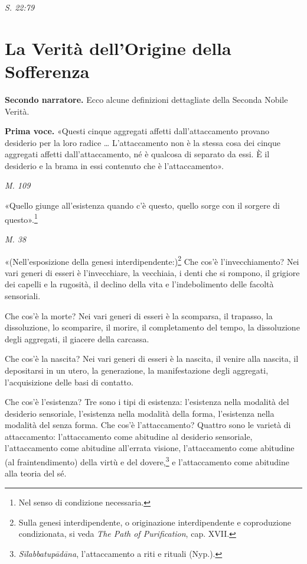\emph{S. 22:79}


\hypertarget{x-la-verità-dell’origine-della-sofferenza}{\section*{La Verità dell’Origine della Sofferenza}}
\textbf{Secondo narratore.} Ecco alcune definizioni dettagliate della Seconda
Nobile Verità.


\textbf{Prima voce.} «Questi cinque aggregati affetti dall’attaccamento provano
desiderio per la loro radice …​ L’attaccamento non è la stessa cosa dei
cinque aggregati affetti dall’attaccamento, né è qualcosa di separato da
essi. È il desiderio e la brama in essi contenuto che è l’attaccamento».


\emph{M. 109}


«Quello giunge all’esistenza quando c’è questo, quello sorge con il
sorgere di questo».\footnote{Nel senso di condizione necessaria.}


\emph{M. 38}


«(Nell’esposizione della genesi interdipendente:)\footnote{Sulla genesi interdipendente, o originazione interdipendente e coproduzione condizionata, si veda \emph{The Path of Purification}, cap. XVII.} Che cos’è l’invecchiamento? Nei vari generi di esseri è l’invecchiare, la
vecchiaia, i denti che si rompono, il grigiore dei capelli e la
rugosità, il declino della vita e l’indebolimento delle facoltà
sensoriali.


Che cos’è la morte? Nei vari generi di esseri è la
scomparsa, il trapasso, la dissoluzione, lo scomparire, il morire, il
completamento del tempo, la dissoluzione degli aggregati, il giacere
della carcassa.


Che cos’è la nascita? Nei vari generi di esseri è la
nascita, il venire alla nascita, il depositarsi in un utero, la
generazione, la manifestazione degli aggregati, l’acquisizione delle
basi di contatto.


Che cos’è l’esistenza? Tre sono i tipi di esistenza:
l’esistenza nella modalità del desiderio sensoriale, l’esistenza nella
modalità della forma, l’esistenza nella modalità del senza forma. Che
cos’è l’attaccamento? Quattro sono le varietà di attaccamento:
l’attaccamento come abitudine al desiderio sensoriale, l’attaccamento
come abitudine all’errata visione, l’attaccamento come abitudine (al
fraintendimento) della virtù e del dovere,\footnote{\emph{Sīlabbatupādāna}, l’attaccamento a riti e rituali (Nyp.).} e
l’attaccamento come abitudine alla teoria del sé.



